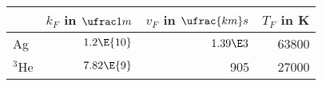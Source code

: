 \begin{tabular}{@{}lrrr}
\midrule
          &    $k_F$ in $\ufrac 1m$&         $v_F$ in $\ufrac {km}s$ &   $T_F$ in K  \\
\midrule
 Ag       & $1.2\E{10}$  &      $1.39\E3$ &   63800 \\
 ${}^3$He & $7.82\E{9}$ & 905        &   27000 \\
\bottomrule
\end{tabular}